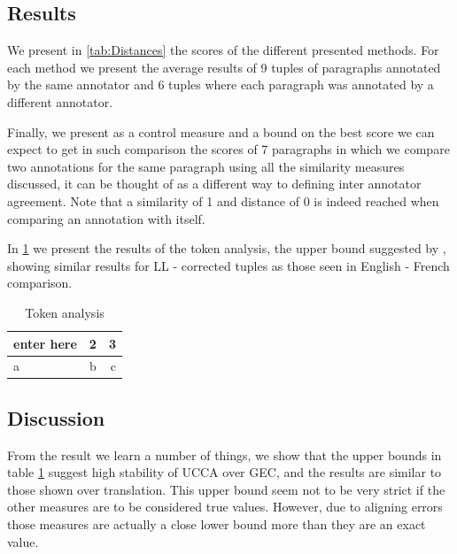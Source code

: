 \documentclass[english]{article}
\begin{document}
	\subsection{Results}
	
	We present in \ref{tab:Distances} the scores of the different presented
	methods. For each method we present the average results of 9 tuples
	of paragraphs annotated by the same annotator and 6 tuples where each
	paragraph was annotated by a different annotator.
	
	Finally, we present as a control measure and a bound on the best score
	we can expect to get in such comparison the scores of 7 paragraphs
	in which we compare two annotations for the same paragraph using all
	the similarity measures discussed, it can be thought of as a different
	way to defining inter annotator agreement. Note that a similarity
	of 1 and distance of 0 is indeed reached when comparing an annotation with itself.
	
	In \ref{tab:Token_analysis} we present the results of the token analysis, the
	upper bound suggested by \cite{sulem2015conceptual}, showing similar
	results for LL - corrected tuples as those seen in English
	- French comparison.
		
		\begin{table}[h!]
			\centering
			\caption{Token analysis}
			\label{tab:Token_analysis}
			\begin{tabular}{l|c||r}
				enter here & 2 & 3\\
				\hline
				a & b & c\\
				\end{tabular}
				\end{table}
				
	\subsection{Discussion}
	
	From the result we learn a number of things, we show that the upper
	bounds in table \ref{tab:Token_analysis} suggest high stability of UCCA over GEC, and the results are similar to those shown over
	translation. This upper bound seem not to be very strict if the other
	measures are to be considered true values. 
	However, due to aligning errors those measures are actually a close lower bound more than they are an exact value.
	
\end{document}
